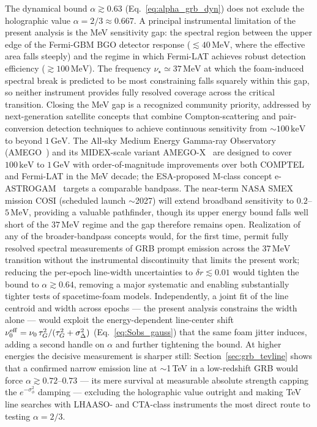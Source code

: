 \documentclass[aps,prd,onecolumn,amsmath,amssymb]{revtex4-2}
\begin{document}
The dynamical bound $\alpha\gtrsim 0.63$
(Eq.~\eqref{eq:alpha_grb_dyn}) does not exclude the holographic value
$\alpha=2/3\approx 0.667$.  A principal instrumental limitation of the
present analysis is the MeV sensitivity gap: the spectral region
between the upper edge of the Fermi-GBM BGO detector response
($\lesssim40\,\mathrm{MeV}$, where the effective area falls steeply)
and the regime in which Fermi-LAT achieves robust detection efficiency
($\gtrsim100\,\mathrm{MeV}$).
The frequency $\nu_\star \simeq 37\,\mathrm{MeV}$ at which the foam-induced
spectral break is predicted to be most constraining falls squarely within
this gap, so neither instrument provides fully resolved coverage across
the critical transition.
Closing the MeV gap is a recognized community priority, addressed by
next-generation satellite concepts that combine Compton-scattering and
pair-conversion detection techniques to achieve continuous sensitivity from
$\sim100\,\mathrm{keV}$ to beyond $1\,\mathrm{GeV}$.
The All-sky Medium Energy Gamma-ray Observatory
(AMEGO~\cite{McEnery2019}) and its MIDEX-scale variant
AMEGO-X~\cite{Caputo2022} are designed to cover $100\,\mathrm{keV}$ to
$1\,\mathrm{GeV}$ with order-of-magnitude improvements over both COMPTEL
and Fermi-LAT in the MeV decade; the ESA-proposed M-class concept
e-ASTROGAM~\cite{DeAngelis2017} targets a comparable bandpass.
The near-term NASA SMEX mission COSI (scheduled launch $\sim$2027)
will extend broadband sensitivity to $0.2$--$5\,\mathrm{MeV}$, providing
a valuable pathfinder, though its upper energy bound falls well short of
the $37\,\mathrm{MeV}$ regime and the gap therefore remains open.
Realization of any of the broader-bandpass concepts would, for the first
time, permit fully resolved spectral measurements of GRB prompt emission
across the $37\,\mathrm{MeV}$ transition without the instrumental
discontinuity that limits the present work; reducing the per-epoch
line-width uncertainties to $\delta r\lesssim 0.01$ would tighten the
bound to $\alpha\gtrsim 0.64$, removing a major systematic and
enabling substantially tighter tests of spacetime-foam models.
Independently, a joint fit of the line centroid and width across epochs
--- the present analysis constrains the width alone --- would exploit
the energy-dependent line-center shift
$\nu_0^{\rm eff}=\nu_0\,\tau_G^2/(\tau_G^2+\sigma_\Delta^2)$
(Eq.~\eqref{eq:Sobs_gauss}) that the same foam jitter induces, adding a
second handle on $\alpha$ and further tightening the bound.
At higher energies the decisive measurement is sharper still:
Section~\ref{sec:grb_tevline} shows that a confirmed narrow emission
line at $\sim$1\,TeV in a low-redshift GRB would force
$\alpha\gtrsim0.72$--$0.73$ --- its mere survival at measurable
absolute strength capping the $e^{-\sigma_\phi^2}$ damping ---
excluding the holographic value outright and making TeV line searches
with LHAASO- and CTA-class instruments the most direct route to
testing $\alpha=2/3$.
\end{document}
